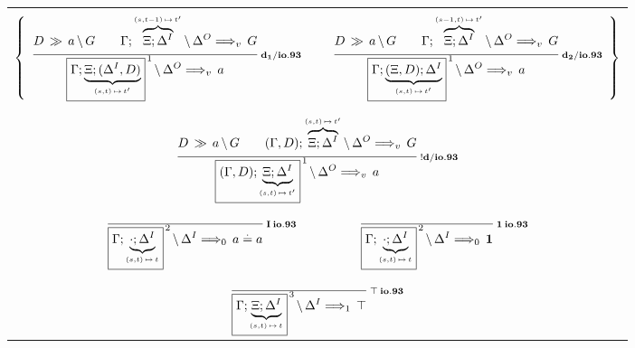 \clearpage
\begin{figure}[t]
  \begin{center}
    \leavevmode

    \begin{tabular}{|c|}
      \hline \\
      $\left\{
        \begin{array}{ccc}
          \ruleII
            {\decd{D}{a}{G}}
            {\ioIXd
              {\G;\ob{\X; \D^I}{s,t-1}{t'}}
              {\D^O}{G}{v}}
            {\ioIXd
              {\fb{\G;\ub{\X;(\D^I,D)}{s,t}{t'}}{1}}
              {\D^O}{a}{v}}
            {d_1/io.93}
        &
          \hspace{0.5em}
        &
          \ruleII
            {\decd{D}{a}{G}}
            {\ioIXd
              {\G; \ob{\X;\D^I}{s-1,t}{t'}}
              {\D^O}{G}{v}}
            {\ioIXd
              {\fb{\G;\ub{(\X,D);\D^I}{s,t}{t'}}{1}}
              {\D^O}{a}{v}}
            {d_2/io.93}
        \end{array}
      \right\}$

      \\ \\ \\
      $\ruleII
        {\decd{D}{a}{G}}
        {\ioIXd
          {(\G,D);\ob{\X;\D^I}{s,t}{t'}}
          {\D^O}{G}{v}}
        {\ioIXd
          {\fb{(\G,D);\ub{\X;\D^I}{s,t}{t'}}{1}}
          {\D^O}{a}{v}}
        {!d/io.93}$

      \\ \\
      $\begin{array}{ccc}
        \ruleI
          {}
          {\ioIXd
            {\fb{\G;\ub{\cdot;\D^I}{s,t}{t}}{2}}
            {\D^I}{\eq{a}{a}}{0}}
          {I \: io.93}
      &
        \hspace{3em}
      &
        \ruleI
          {}
          {\ioIXd
            {\fb{\G;\ub{\cdot;\D^I}{s,t}{t}}{2}}
            {\D^I}{\One}{0}}
          {\One \: io.93}
      \end{array}$

      \\ \\
      $\ruleI
        {}
        {\ioIXd
          {\fb{\G;\ub{\X;\D^I}{s,t}{t}}{3}}
          {\D^I}{\Top}{1}}
        {\Top \: io.93}$


\end{tabular}
\end{center}
\end{figure}
